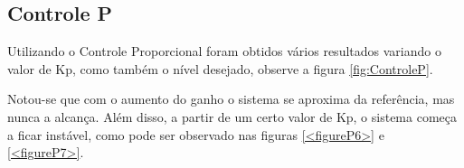 \documentclass[a4paper,12pt]{article}
\begin{document}
\subsection{Controle P}
\hspace{4ex}Utilizando o Controle Proporcional foram obtidos vários resultados variando o valor de Kp, como também o nível desejado, observe a figura \ref{fig:ControleP}.

\hspace{4ex}Notou-se que com o aumento do ganho o sistema se aproxima da referência, mas nunca a alcança. Além disso, a partir de um certo valor de Kp, o sistema começa a ficar instável, como pode ser observado nas figuras \ref{<figureP6>} e \ref{<figureP7>}.
\begin{figure}[H]
     \centering
     \hspace{4ex}
     \\
     \hspace{4ex}

\end{figure}
\end{document}
